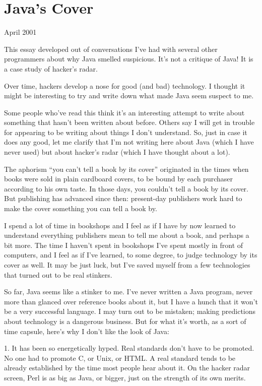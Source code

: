 \chapter{Java's Cover}

April 2001

This essay developed out of conversations I've had with several other
programmers about why Java smelled suspicious. It's not a critique of
Java! It is a case study of hacker's radar.

Over time, hackers develop a nose for good (and bad) technology. I
thought it might be interesting to try and write down what made Java
seem suspect to me.

Some people who've read this think it's an interesting attempt to write
about something that hasn't been written about before. Others say I will
get in trouble for appearing to be writing about things I don't
understand. So, just in case it does any good, let me clarify that I'm
not writing here about Java (which I have never used) but about hacker's
radar (which I have thought about a lot).

The aphorism ``you can't tell a book by its cover'' originated in the
times when books were sold in plain cardboard covers, to be bound by
each purchaser according to his own taste. In those days, you couldn't
tell a book by its cover. But publishing has advanced since then:
present-day publishers work hard to make the cover something you can
tell a book by.

I spend a lot of time in bookshops and I feel as if I have by now
learned to understand everything publishers mean to tell me about a
book, and perhaps a bit more. The time I haven't spent in bookshops I've
spent mostly in front of computers, and I feel as if I've learned, to
some degree, to judge technology by its cover as well. It may be just
luck, but I've saved myself from a few technologies that turned out to
be real stinkers.

So far, Java seems like a stinker to me. I've never written a Java
program, never more than glanced over reference books about it, but I
have a hunch that it won't be a very successful language. I may turn out
to be mistaken; making predictions about technology is a dangerous
business. But for what it's worth, as a sort of time capsule, here's why
I don't like the look of Java:

1. It has been so energetically hyped. Real standards don't have to be
promoted. No one had to promote C, or Unix, or HTML. A real standard
tends to be already established by the time most people hear about it.
On the hacker radar screen, Perl is as big as Java, or bigger, just on
the strength of its own merits.

